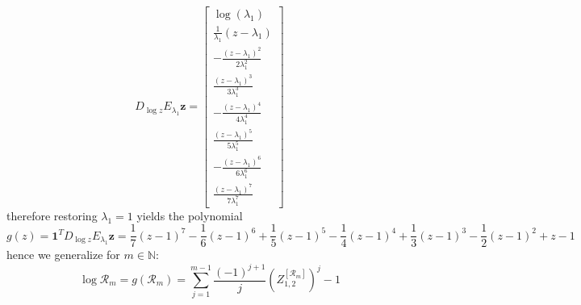\begin{displaymath}
D_{\log{z}}E_{\lambda_{1}}\boldsymbol{z} = \left[\begin{matrix}\log{\left (\lambda_{1} \right )}\\\frac{1}{\lambda_{1}} \left(z - \lambda_{1}\right)\\- \frac{\left(z - \lambda_{1}\right)^{2}}{2 \lambda_{1}^{2}}\\\frac{\left(z - \lambda_{1}\right)^{3}}{3 \lambda_{1}^{3}}\\- \frac{\left(z - \lambda_{1}\right)^{4}}{4 \lambda_{1}^{4}}\\\frac{\left(z - \lambda_{1}\right)^{5}}{5 \lambda_{1}^{5}}\\- \frac{\left(z - \lambda_{1}\right)^{6}}{6 \lambda_{1}^{6}}\\\frac{\left(z - \lambda_{1}\right)^{7}}{7 \lambda_{1}^{7}}\end{matrix}\right]
\end{displaymath}
therefore restoring $\lambda_{1}=1$ yields the polynomial
\begin{displaymath}
g{\left (z \right )} = \boldsymbol{1}^{T}D_{\log{z}}E_{\lambda_{1}}\boldsymbol{z} = \frac{1}{7} \left(z - 1\right)^{7} - \frac{1}{6} \left(z - 1\right)^{6} + \frac{1}{5} \left(z - 1\right)^{5} - \frac{1}{4} \left(z - 1\right)^{4} + \frac{1}{3} \left(z - 1\right)^{3} - \frac{1}{2} \left(z - 1\right)^{2} + z - 1
\end{displaymath}
hence we generalize for $m\in\mathbb{N}$:
\begin{displaymath}
\log{\mathcal{R}_{m}} = g{\left (\mathcal{R}_{m} \right )} = \sum_{j=1}^{m-1}{\frac{(-1)^{j+1}}{j}{\left(Z_{1,2}^{[\mathcal{R}_{m}]}\right)^{j} }} -1
\end{displaymath}
